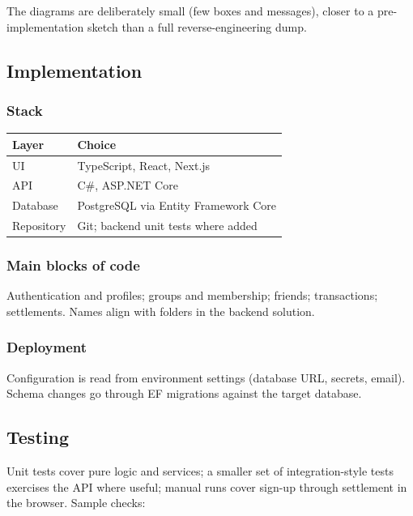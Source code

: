 \documentclass[11pt,a4paper]{article}
\begin{document}
\vspace{0.5em}
\noindent The diagrams are deliberately small (few boxes and messages), closer to a pre-implementation sketch than a full reverse-engineering dump.

\subsection{Implementation}

\subsubsection{Stack}

\begin{center}
\begin{tabular}{@{}ll@{}}
\toprule
\textbf{Layer} & \textbf{Choice} \\
\midrule
UI & TypeScript, React, Next.js \\
API & C\#, ASP.NET Core \\
Database & PostgreSQL via Entity Framework Core \\
Repository & Git; backend unit tests where added \\
\bottomrule
\end{tabular}
\end{center}

\subsubsection{Main blocks of code}

Authentication and profiles; groups and membership; friends; transactions; settlements. Names align with folders in the backend solution.

\subsubsection{Deployment}

Configuration is read from environment settings (database URL, secrets, email). Schema changes go through EF migrations against the target database.

\subsection{Testing}

Unit tests cover pure logic and services; a smaller set of integration-style tests exercises the API where useful; manual runs cover sign-up through settlement in the browser. Sample checks:
\end{document}
